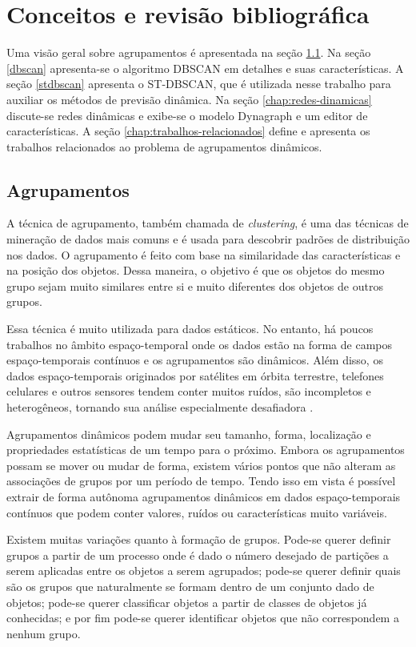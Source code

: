 \chapter{Conceitos e revisão bibliográfica}
\label{chap:estadodaarte}

Uma visão geral sobre agrupamentos é apresentada na seção \ref{agrupamentos}. Na seção \ref{dbscan} apresenta-se o algoritmo DBSCAN em detalhes e suas características. A seção \ref{stdbscan} apresenta o ST-DBSCAN, que é utilizada nesse trabalho para auxiliar os métodos de previsão dinâmica. Na seção  \ref{chap:redes-dinamicas}  discute-se redes dinâmicas e exibe-se o modelo Dynagraph e um editor de características. A seção  \ref{chap:trabalhos-relacionados}  define e apresenta os trabalhos relacionados ao problema de agrupamentos dinâmicos.

\section{Agrupamentos}
\label{agrupamentos}

A técnica de agrupamento, também chamada de \textit{clustering}, é uma das técnicas de mineração de dados mais comuns e é usada para descobrir padrões de distribuição nos dados. O agrupamento é feito com base na similaridade das características e na posição dos objetos. Dessa maneira, o objetivo é que os objetos do mesmo grupo sejam muito similares entre si e muito diferentes dos objetos de outros grupos.

Essa técnica é muito utilizada para dados estáticos. No entanto, há poucos trabalhos no âmbito espaço-temporal onde os dados estão na forma de campos espaço-temporais contínuos e os agrupamentos são dinâmicos. Além disso, os dados espaço-temporais originados por satélites em órbita terrestre, telefones celulares e outros sensores tendem conter muitos ruídos, são incompletos e heterogêneos, tornando sua análise especialmente desafiadora \cite{faghmous2013}.

Agrupamentos dinâmicos podem mudar seu tamanho, forma, localização e propriedades estatísticas de um tempo para o próximo. Embora os agrupamentos possam se mover ou mudar de forma, existem vários pontos que não alteram as associações de grupos por um período de tempo. Tendo isso em vista é possível extrair de forma autônoma agrupamentos dinâmicos em dados espaço-temporais contínuos que podem conter valores, ruídos ou características muito variáveis.

Existem muitas variações quanto à formação de grupos. Pode-se querer definir grupos a partir de um processo onde é dado o número desejado de partições a serem aplicadas entre os objetos a serem agrupados; pode-se querer definir quais são os grupos que naturalmente se formam dentro de um conjunto dado de objetos; pode-se querer classificar objetos a partir de classes de objetos já conhecidas; e por fim pode-se querer identificar objetos que não correspondem a nenhum grupo. 

